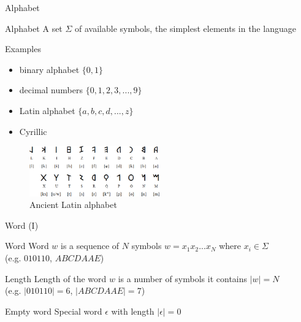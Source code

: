 \documentclass{beamer}
\begin{document}

\begin{frame}{Alphabet}

\begin{block}{Alphabet}
A set $\Sigma$ of available symbols, the simplest elements in the language
\end{block}

\begin{exampleblock}{Examples}
\begin{itemize}
\item binary alphabet $\{0, 1\}$
\item decimal numbers $\{0,1,2,3,...,9\}$
\item Latin alphabet $\{a,b,c,d,...,z\}$
\item Cyrillic
\end{itemize}
\end{exampleblock}

\begin{figure}
\includegraphics[width=0.5\textwidth]{img/latin_archaic.png}
\caption{\label{fig:latin_archaic}Ancient Latin alphabet}
\end{figure}

\end{frame}


\begin{frame}{Word (I)}
\begin{block}{Word}
Word $w$ is a sequence of $N$ symbols $w = x_1x_2...x_N$ where $x_i\in\Sigma$ \\ (e.g. $010110$, $ABCDAAE$)
\end{block}

\begin{block}{Length}
Length of the word $w$ is a number of symbols it contains $|w|=N$ \\ (e.g. $|010110| = 6$, $|ABCDAAE| = 7$)
\end{block}

\begin{alertblock}{Empty word}
Special word $\epsilon$ with length $|\epsilon|=0$
\end{alertblock}

\end{frame}
\end{document}
